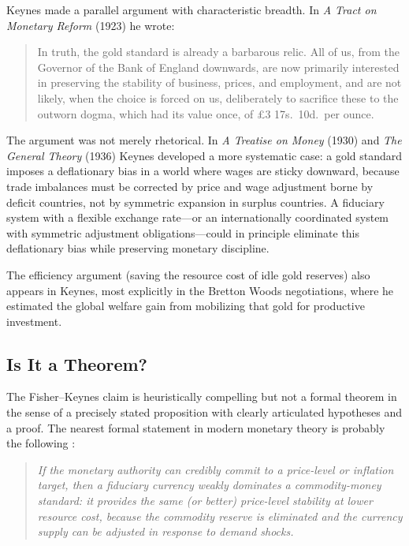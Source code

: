 \documentclass[12pt]{article}
\begin{document}
Keynes made a parallel argument with characteristic breadth.
In \textit{A Tract on Monetary Reform} (1923) he wrote:

\begin{quote}
In truth, the gold standard is already a barbarous relic.  All of
us, from the Governor of the Bank of England downwards, are now
primarily interested in preserving the stability of business,
prices, and employment, and are not likely, when the choice is
forced on us, deliberately to sacrifice these to the outworn
dogma, which had its value once, of \pounds 3 17s.\ 10\textonehalf d.\ per ounce. 
\citep{Keynes1923}
\end{quote}

The argument was not merely rhetorical.  In \textit{A Treatise on
Money} (1930) and \textit{The General Theory} (1936) Keynes
developed a more systematic case: a gold standard imposes
a deflationary bias in a world where wages are sticky downward,
because trade imbalances must be corrected by price and wage
adjustment borne by deficit countries, not by symmetric expansion
in surplus countries.  A fiduciary system with a flexible exchange
rate---or an internationally coordinated system with symmetric
adjustment obligations---could in principle eliminate this
deflationary bias while preserving monetary discipline.

The efficiency argument (saving the resource cost of idle gold
reserves) also appears in Keynes, most explicitly in the Bretton
Woods negotiations, where he estimated the global welfare gain
from mobilizing that gold for productive investment.

\subsection{Is It a Theorem?}

The Fisher--Keynes claim is heuristically compelling but not a
formal theorem in the sense of a precisely stated proposition
with clearly articulated hypotheses and a proof.  The nearest
formal statement in modern monetary theory is probably the
following \citep[cf.][]{FriedmanSchwartz1963, Lucas1992}:

\begin{quote}
\textit{If the monetary authority can credibly commit to a
price-level or inflation target, then a fiduciary currency
weakly dominates a commodity-money standard: it provides the
same (or better) price-level stability at lower resource cost,
because the commodity reserve is eliminated and the currency
supply can be adjusted in response to demand shocks.}
\end{quote}
\end{document}
